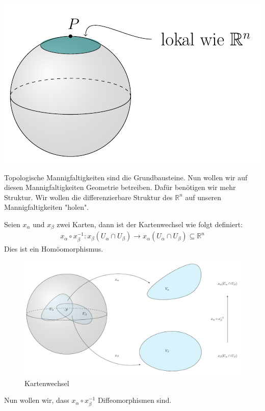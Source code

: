 \begin{minipage}[H]{.2\textwidth}
\vspace{-0.5cm}
\includegraphics[scale=0.5]{figures/tikz/sphere_local_rn}
\end{minipage}


Topologische Mannigfaltigkeiten sind die Grundbausteine. Nun wollen wir auf diesen Mannigfaltigkeiten Geometrie betreiben. Dafür benötigen wir mehr Struktur. Wir wollen die differenzierbare Struktur des $\mathbb{R}^n$ auf unseren Mannigfaltigkeiten "holen".

\begin{defs}[Kartenwechsel]
Seien $x_{\alpha}$ und $x_{\beta}$ zwei Karten, dann ist der Kartenwechsel wie folgt definiert: \\
\begin{align}
x_{\alpha}\circ x_{\beta}^{-1}: x_{\beta}(U_{\alpha}\cap U_{\beta}) \rightarrow x_{\alpha}(U_{\alpha}\cap U_{\beta}) \subseteq \mathbb{R}^n
\end{align}
Dies ist ein Homöomorphismus.

\begin{figure}[H]
\centering
\includegraphics[width=1.0\linewidth]{figures/tikz/map_change.pdf}
\caption{Kartenwechsel}
\label{img:kartenwechsel}
\end{figure} 

\end{defs}
Nun wollen wir, dass $x_{\alpha}\circ x_{\beta}^{-1}$ Diffeomorphismen sind.

